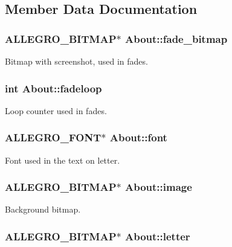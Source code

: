 \subsection{Member Data Documentation}
\hypertarget{structAbout_a0c80b08e1d60093504bed342b41e51c1}{
\subsubsection[{fade\-\_\-bitmap}]{\setlength{\rightskip}{0pt plus 5cm}A\-L\-L\-E\-G\-R\-O\-\_\-\-B\-I\-T\-M\-A\-P$\ast$ About\-::fade\-\_\-bitmap}}\label{structAbout_a0c80b08e1d60093504bed342b41e51c1}
Bitmap with screenshot, used in fades. \hypertarget{structAbout_a3a7b7ae29163ae843671a2c2b5e8c1f0}{
\subsubsection[{fadeloop}]{\setlength{\rightskip}{0pt plus 5cm}int About\-::fadeloop}}\label{structAbout_a3a7b7ae29163ae843671a2c2b5e8c1f0}
Loop counter used in fades. \hypertarget{structAbout_ad14358b4942c0260e502a65b98732f93}{
\subsubsection[{font}]{\setlength{\rightskip}{0pt plus 5cm}A\-L\-L\-E\-G\-R\-O\-\_\-\-F\-O\-N\-T$\ast$ About\-::font}}\label{structAbout_ad14358b4942c0260e502a65b98732f93}
Font used in the text on letter. \hypertarget{structAbout_a9e724aa84d322d2bfff5c00109492a1d}{
\subsubsection[{image}]{\setlength{\rightskip}{0pt plus 5cm}A\-L\-L\-E\-G\-R\-O\-\_\-\-B\-I\-T\-M\-A\-P$\ast$ About\-::image}}\label{structAbout_a9e724aa84d322d2bfff5c00109492a1d}
Background bitmap. \hypertarget{structAbout_aa46380e60629ac39d782e18dc6a08f8e}{
\subsubsection[{letter}]{\setlength{\rightskip}{0pt plus 5cm}A\-L\-L\-E\-G\-R\-O\-\_\-\-B\-I\-T\-M\-A\-P$\ast$ About\-::letter}}\label{structAbout_aa46380e60629ac39d782e18dc6a08f8e}
